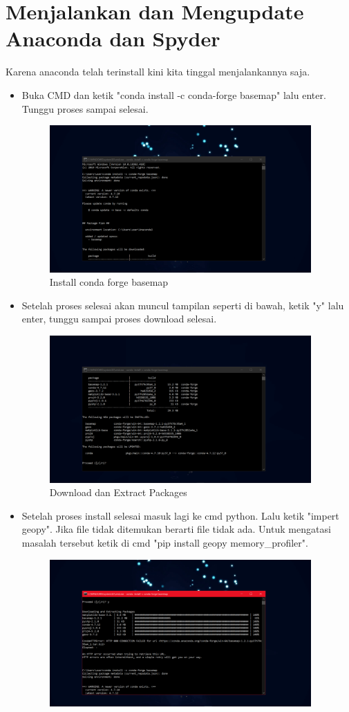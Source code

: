 \documentclass{article}
\begin{document}
\section{Menjalankan dan Mengupdate Anaconda dan Spyder}
Karena anaconda telah terinstall kini kita tinggal menjalankannya saja.

\begin{itemize}
\item Buka CMD dan ketik "conda install -c conda-forge basemap" lalu enter. Tunggu proses sampai selesai.
\begin{figure}[!htbp]
	\centering
	\includegraphics[width=10cm]{figures/conda1.png}
	\caption{Install conda forge basemap}
\end{figure}
\item Setelah proses selesai akan muncul tampilan seperti di bawah, ketik "y" lalu enter, tunggu sampai proses download selesai.
\begin{figure}[!htbp]
	\centering
	\includegraphics[width=10cm]{figures/conda2.png}
	\caption{Download dan Extract Packages}
\end{figure}
\item Setelah proses install selesai masuk lagi ke cmd python. Lalu ketik "impert geopy". Jika file tidak ditemukan berarti file tidak ada. Untuk mengatasi masalah tersebut ketik di cmd "pip install geopy memory_profiler".
\begin{figure}[!htbp]
	\centering
	\includegraphics[width=10cm]{figures/conda3.png}

\end{figure}
\end{itemize}
\end{document}
